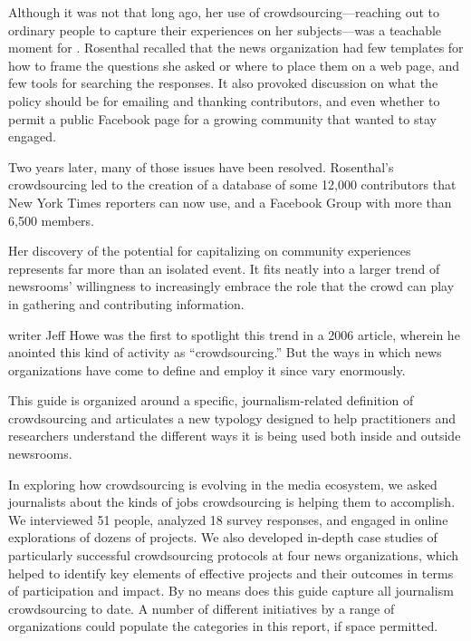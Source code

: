 \begin{itemize}
Although it was not that long ago, her use of crowdsourcing---reaching out to ordinary people to capture their experiences on her subjects---was a teachable moment for . Rosenthal recalled that the news organization had few templates for how to frame the questions she asked or where to place them on a web page, and few tools for searching the responses. It also provoked discussion on what the policy should be for emailing and thanking contributors, and even whether to permit a public Facebook page for a growing community that wanted to stay engaged. 

Two years later, many of those issues have been resolved. Rosenthal’s crowdsourcing led to the creation of a database of some 12,000 contributors that New York Times reporters can now use, and a Facebook Group with more than 6,500 members.

Her discovery of the potential for capitalizing on community experiences represents far more than an isolated event. It fits neatly into a larger trend of newsrooms’ willingness to increasingly embrace the role that the crowd can play in gathering and contributing information.

 writer Jeff Howe was the first to spotlight this trend in a 2006 article, wherein he anointed this kind of activity as ``crowdsourcing.''\autocite{Howe} But the ways in which news organizations have come to define and employ it since vary enormously. 

This guide is organized around a specific, journalism-related definition of crowdsourcing and articulates a new typology designed to help practitioners and researchers understand the different ways it is being used both inside and outside newsrooms. 

In exploring how crowdsourcing is evolving in the media ecosystem, we asked journalists about the kinds of jobs crowdsourcing is helping them to accomplish. We interviewed 51 people, analyzed 18 survey responses, and engaged in online explorations of dozens of projects. We also developed in-depth case studies of particularly successful crowdsourcing protocols at four news organizations, which helped to identify key elements of effective projects and their outcomes in terms of participation and impact.
By no means does this guide capture all journalism crowdsourcing to date. A number of different initiatives by a range of organizations could populate the categories in this report, if space permitted.


\end{itemize}
